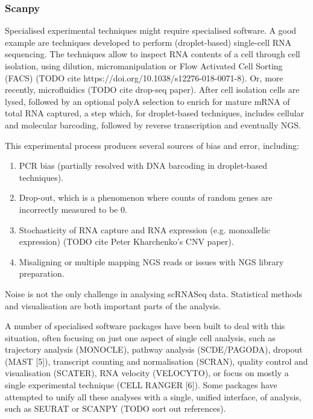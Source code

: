 \subsubsection{Scanpy}

Specialised experimental techniques might require specialised software. A good example are techniques developed to perform (droplet-based) single-cell RNA sequencing. The techniques allow to inspect RNA contents of a cell through cell isolation, using dilution, micromanipulation or Flow Activated Cell Sorting (FACS) (TODO cite https://doi.org/10.1038/s12276-018-0071-8). Or, more recently, microfluidics (TODO cite drop-seq paper). After cell isolation cells are lysed, followed by an optional polyA selection to enrich for mature mRNA of total RNA captured, a step which, for droplet-based techniques, includes cellular and molecular barcoding, followed by reverse transcription and eventually NGS.

This experimental process produces several sources of bias and error, including:
\begin{enumerate}
\item PCR bias (partially resolved with DNA barcoding in droplet-based techniques).
\item Drop-out, which is a phenomenon where counts of random genes are incorrectly measured to be 0.
\item Stochasticity of RNA capture and RNA expression (e.g. monoallelic expression) (TODO cite Peter Kharchenko's CNV paper).
\item Misaligning or multiple mapping NGS reads or issues with NGS library preparation.
\end{enumerate}

Noise is not the only challenge in analysing scRNASeq data. Statistical methods and visualisation are both important parts of the analysis.

A number of specialised software packages have been built to deal with this situation, often focusing on just one aspect of single cell analysis, such as trajectory analysis (MONOCLE), pathway analysis (SCDE/PAGODA), dropout (MAST [5]), transcript counting and normalisation (SCRAN), quality control and visualisation (SCATER), RNA velocity (VELOCYTO), or focus on mostly a single experimental technique (CELL RANGER [6]). Some packages have attempted to unify all these analyses with a single, unified interface, of analysis, such as SEURAT or SCANPY (TODO sort out references).

